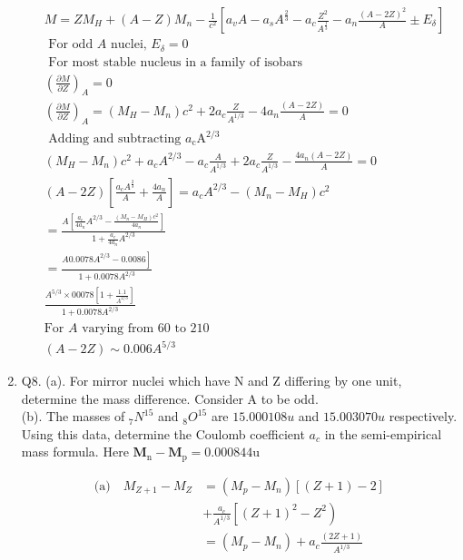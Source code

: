 \begin{enumerate}
\begin{answer}
	\begin{align*}
&	M=Z M_H+(A-Z) M_n-\frac{1}{c^2}\left[a_v A-a_s A^{\frac{2}{3}}-a_c \frac{Z^2}{A^{\frac{1}{3}}}-a_n \frac{(A-2 Z)^2}{A} \pm E_\delta\right]\\
&\text{	For odd $A$ nuclei, $E_\delta=0$}\\
&\text{	For most stable nucleus in a family of isobars}\\
&\left(\frac{\partial M}{\partial Z}\right)_A=0\\
&\left(\frac{\partial M}{\partial Z}\right)_A=\left(M_H-M_n\right) c^2+2 a_{c} \frac{Z}{A^{1/3}}-4 a_n \frac{\left(A-2 Z\right)}{A}=0\\
&\text { Adding and subtracting } {a}_{\mathrm{c}} \mathrm{A}^{2 / 3}\\
&\left(M_H-M_n\right) c^2+a_{c} A^{2 / 3}-a_c \frac{A}{A^{1/3}}+2 a_{c} \frac{Z}{A^{1/3}}-\frac{4 a_n(A-2 Z)}{A}=0\\
&(A-2 Z)\left[\frac{a_c A^{\frac{2}{3}}}{A}+\frac{4 a_n}{A}\right]=a_c A^{2 / 3}-\left(M_n-M_H\right) c^2\\
&=\frac{A\left[\frac{a_c}{4 a_n} A^{2 / 3}-\frac{\left(M_n-M_H\right) c^2}{4 a_n}\right]}{1+\frac{a_c}{4 a_n} A^{2 / 3}}\\
&=\frac{\left.A 0.0078 A^{2 / 3}-0.0086\right]}{1+0.0078 A^{2 / 3}}\\
&\frac{A^{5 / 3} \times 00078\left[1+\frac{1.1}{A^{2 / 3}}\right]}{1+0.0078 A^{2 / 3}}\\
&\text{For $A$ varying from 60 to 210}\\
&(A-2 Z) \sim 0.006 A^{5 / 3}
	\end{align*}
\end{answer}
\item Q8. (a). For mirror nuclei which have $\mathrm{N}$ and $\mathrm{Z}$ differing by one unit, determine the mass difference. Consider A to be odd.\\
(b). The masses of ${ }_7 N^{15}$ and ${ }_8 O^{15}$ are $15.000108 u$ and $15.003070 u$ respectively. Using this data, determine the Coulomb coefficient $a_c$ in the semi-empirical mass formula. Here $\mathbf{M}_{\mathrm{n}}-\mathbf{M}_{\mathrm{p}}=0.000844 \mathrm{u}$
\begin{answer}
	\begin{align*}
	\text{(a)}\quad M_{Z+1}-M_Z&=\left(M_p-M_n\right)[(Z+1)-2]\\
	&+\frac{a_c}{A^{1 / 3}}\left[(Z+1)^2-Z^2\right)\\
	&=\left(M_p-M_n\right)+a_c \frac{(2Z+1)}{A^{1 / 3}}\\

\end{align*}
\end{answer}
\end{enumerate}

